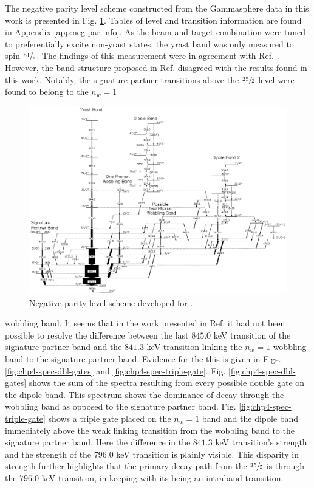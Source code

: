 The negative parity level scheme constructed from the Gammasphere data in this work is presented in Fig. \ref{fig:chp4-neg-par-lvl-schm}. Tables of level and transition information are found in Appendix \ref{app:neg-par-info}. As the beam and target combination were tuned to preferentially excite non-yrast states, the yrast band was only measured to spin $\sfrac{51}{2}$. The findings of this measurement were in agreement with Ref. \cite{ePaul135Pr}. However, the band structure proposed in Ref. \cite{semkow135Pr} disagreed with the results found in this work. Notably, the signature partner transitions above the $\sfrac{25}{2}$ level were found to belong to the $n_w=1$
\begin{landscape}
\begin{figure}[h!]
\centerline{\includegraphics[height=0.9\textheight]{./img/c4/135Pr_Np_for_diss.pdf}}
	\caption{Negative parity level scheme developed for \pr{}. \label{fig:chp4-neg-par-lvl-schm}}
\end{figure}
\end{landscape}
\noindent{}wobbling band. It seems that in the work presented in Ref. \cite{semkow135Pr} it had not been possible to resolve the difference between the last $845.0$ keV transition of the signature partner band and the $841.3$ keV transition linking the $n_w=1$ wobbling band to the signature partner band. Evidence for the this is given in Figs. \ref{fig:chp4-spec-dbl-gates} and \ref{fig:chp4-spec-triple-gate}. Fig. \ref{fig:chp4-spec-dbl-gates} shows the sum of the spectra resulting from every possible double gate on the dipole band. This spectrum shows the dominance of decay through the wobbling band as opposed to the signature partner band. Fig. \ref{fig:chp4-spec-triple-gate} shows a triple gate placed on the $n_w=1$ band and the dipole band immediately above the weak linking transition from the wobbling band to the signature partner band. Here the difference in the $841.3$ keV transition's strength and the strength of the $796.0$ keV transition is plainly visible. This disparity in strength further highlights that the primary decay path from the $\sfrac{25}{2}$ is through the $796.0$ keV transition, in keeping with its being an intraband transition.

